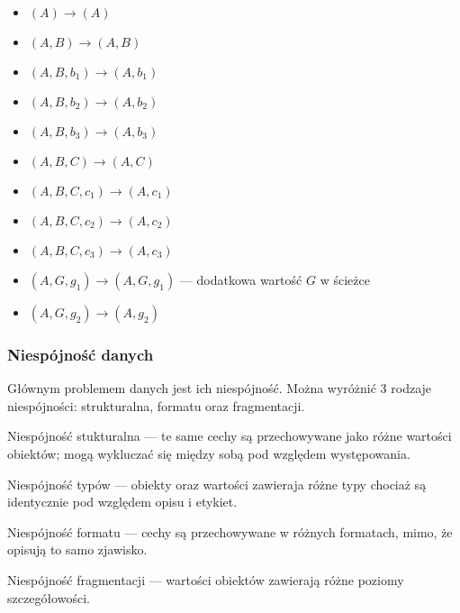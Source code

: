 \begin{itemize}
\item $(A) \to (A)$
\item $(A, B) \to (A, B)$
\item $(A, B, b_1) \to (A, b_1)$
\item $(A, B, b_2) \to (A, b_2)$
\item $(A, B, b_3) \to (A, b_3)$
\item $(A, B, C) \to (A, C)$
\item $(A, B, C, c_1) \to (A, c_1)$
\item $(A, B, C, c_2) \to (A, c_2)$
\item $(A, B, C, c_3) \to (A, c_3)$
\item $(A, G, g_1) \to (A, G, g_1)$ --- 
      dodatkowa wartość $G$ w ścieżce
\item $(A, G, g_2) \to (A, g_2)$
\end{itemize}



\subsubsection{Niespójność danych}

Głównym problemem danych jest ich niespójność. Można wyróżnić
3 rodzaje niespójności: strukturalna, formatu oraz fragmentacji.

\begin{defi}
Niespójność stukturalna --- te same cechy są przechowywane jako
różne wartości obiektów; mogą wykluczać się między sobą pod
względem występowania.
\label{def:niespójność-strukturalna}
\end{defi}

\begin{defi}
Niespójność typów --- obiekty oraz wartości zawieraja różne
typy chociaż są identycznie pod względem opisu i etykiet.
\label{def:niespójność-typu}
\end{defi}

\begin{defi}
Niespójność formatu --- cechy są przechowywane w różnych formatach,
mimo, że opisują to samo zjawisko.
\label{def:niespójność-formatu}
\end{defi}

\begin{defi}
Niespójność fragmentacji --- wartości obiektów zawierają różne
poziomy szczegółowości.
\label{def:niespójność-fragmentacji}
\end{defi}


